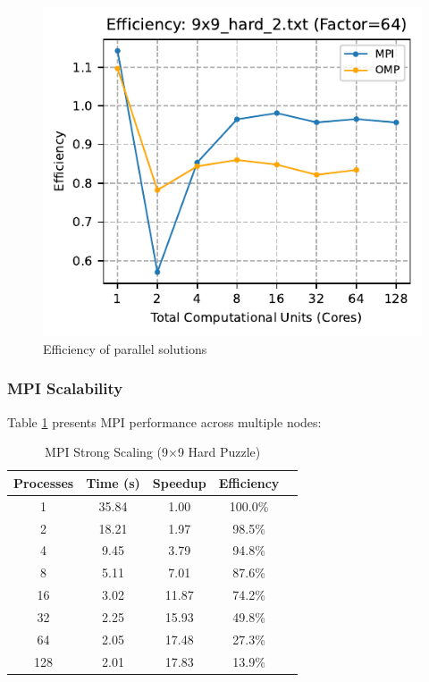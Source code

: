 \begin{figure}[htbp]
\centering
\includegraphics[width=0.9\linewidth]{imgs/efficiency_mpi_omp_9x9_hard_2.pdf}
\caption{Efficiency of parallel solutions}
\label{fig:efficiency_9x9}
\end{figure}




\subsubsection{MPI Scalability}
Table \ref{tab:mpi_scaling} presents MPI performance across multiple nodes:

\begin{table}[htbp]
\caption{MPI Strong Scaling (9×9 Hard Puzzle)}
\begin{center}
\begin{tabular}{@{}ccccc@{}}
\toprule
\textbf{Processes} & \textbf{Time (s)} & \textbf{Speedup} & \textbf{Efficiency} \\
\midrule
1 & 35.84 & 1.00 & 100.0\% \\
2 & 18.21 & 1.97 & 98.5\% \\
4 & 9.45 & 3.79 & 94.8\% \\
8 & 5.11 & 7.01 & 87.6\% \\
16 & 3.02 & 11.87 & 74.2\% \\
32 & 2.25 & 15.93 & 49.8\% \\
64 & 2.05 & 17.48 & 27.3\% \\
128 & 2.01 & 17.83 & 13.9\% \\
\bottomrule
\end{tabular}
\end{center}
\label{tab:mpi_scaling}
\end{table}

